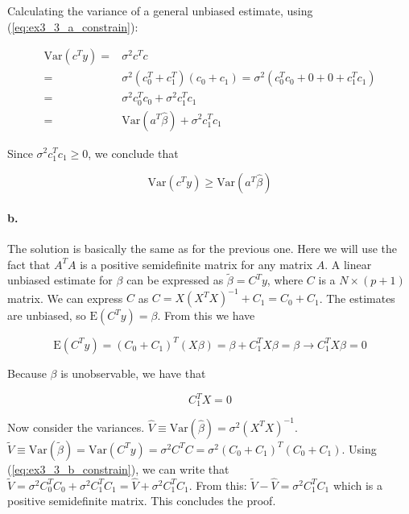 \documentclass{article}
\begin{document}
Calculating the variance of a general unbiased estimate, using (\ref{eq:ex3_3_a_constrain}):

\begin{equation}
\begin{split}
    \text{Var}(c^T y) =& \sigma^2 c^T c\\
    =& \sigma^2 (c^T_0 + c^T_1)(c_0 + c_1) = \sigma^2 (c^T_0 c_0 + 0 + 0 + c^T_1 c_1)\\
    =& \sigma^2 c^T_0 c_0 + \sigma^2 c^T_1 c_1\\
    =& \text{Var}(a^T \hat{\beta}) + \sigma^2 c^T_1 c_1
\end{split}
\end{equation}

Since $\sigma^2 c^T_1 c_1 \ge 0$, we conclude that

\begin{equation}
    \text{Var}(c^Ty) \ge \text{Var}(a^T\hat{\beta})
\end{equation}

\paragraph{b.} The solution is basically the same as for the previous one. Here we will use the fact that $A^TA$ is a positive semidefinite matrix for any matrix $A$. A linear unbiased estimate for $\beta$ can be expressed as $\widetilde{\beta} = C^T y$, where $C$ is a $N \times (p+1)$ matrix. We can express $C$ as $C = X(X^TX)^{-1} + C_1 = C_0 + C_1$. The estimates are unbiased, so $\text{E}(C^Ty) = \beta$. From this we have

\begin{equation}
    \text{E}(C^Ty) = (C_0 + C_1)^T (X\beta) = \beta + C^T_1 X \beta = \beta \to C^T_1 X \beta = 0
\end{equation}

Because $\beta$ is unobservable, we have that

\begin{equation} \label{eq:ex3_3_b_constrain}
    C^T_1 X = 0
\end{equation}

Now consider the variances. $\hat{V} \equiv \text{Var}(\hat{\beta}) = \sigma^2 (X^TX)^{-1}$. $\tilde{V} \equiv \text{Var}(\tilde{\beta}) = \text{Var}(C^Ty) = \sigma^2 C^TC = \sigma^2 (C_0 + C_1)^T (C_0 + C_1)$. Using (\ref{eq:ex3_3_b_constrain}), we can write that $\tilde{V} = \sigma^2 C^T_0 C_0 + \sigma^2 C^T_1 C_1 = \hat{V} + \sigma^2 C^T_1 C_1$. From this: $\tilde{V} - \hat{V} = \sigma^2 C^T_1 C_1$ which is a positive semidefinite matrix. This concludes the proof.
\end{document}
